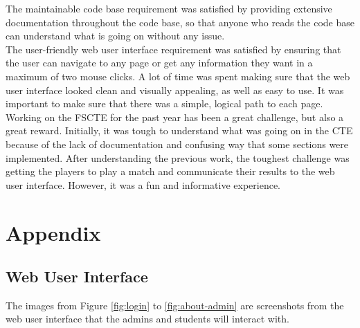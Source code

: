 \documentclass[a4paper, 11pt]{report}
\begin{document}
The maintainable code base requirement was satisfied by providing extensive
documentation throughout the code base, so that anyone who reads the code base
can understand what is going on without any issue. \\

The user-friendly web user interface requirement was satisfied by ensuring that
the user can navigate to any page or get any information they want in a maximum
of two mouse clicks. A lot of time was spent making sure that the web user
interface looked clean and visually appealing, as well as easy to use. It was
important to make sure that there was a simple, logical path to each page. \\

Working on the FSCTE for the past year has been a great challenge, but also a
great reward. Initially, it was tough to understand what was going on in the CTE
because of the lack of documentation and confusing way that some sections were
implemented. After understanding the previous work, the toughest challenge was
getting the players to play a match and communicate their results to the web
user interface. However, it was a fun and informative experience.

\chapter{Appendix}

\section{Web User Interface}

The images from Figure \ref{fig:login} to \ref{fig:about-admin} are screenshots
from the web user interface that the admins and students will interact with.
\vspace{0.4cm}
\end{document}
